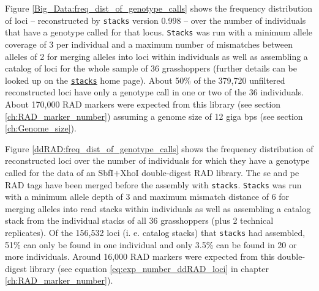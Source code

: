 \documentclass[a4paper,12pt,times,print,index, custombib]{PhDThesisPSnPDF}\usepackage[]{graphicx}\usepackage[]{color}
\begin{document}
Figure \ref{Big_Data:freq_dist_of_genotype_calls} shows the frequency distribution of loci -- reconstructed by \texttt{stacks} version 0.998 -- over the number of individuals that have a genotype called for that locus. \texttt{Stacks} was run with a minimum allele coverage of 3 per individual and a maximum number of mismatches between alleles of 2 for merging alleles into loci within individuals as well as assembling a catalog of loci for the whole sample of 36 grasshoppers (further details can be looked up on the \href{http://creskolab.uoregon.edu/stacks/param_tut.php}{\texttt{stacks}} home page). About 50\% of the 379,720 unfiltered reconstructed loci have only a genotype call in one or two of the 36 individuals. About 170,000 RAD markers were expected from this library (see section \ref{ch:RAD_marker_number}) assuming a genome size of 12 giga \glspl{bp} (see section \ref{ch:Genome_size}).


Figure \ref{ddRAD:freq_dist_of_genotype_calls} shows the frequency distribution of reconstructed loci over the number of individuals for which they have a genotype called for the data of an \gls{SbfI}$+$\gls{XhoI} double-digest RAD library. The \gls{se} and \gls{pe} \glspl{RAD tag} have been merged before the assembly with \texttt{stacks}. \texttt{Stacks} was run with a minimum allele depth of 3 and maximum mismatch distance of 6 for merging alleles into read stacks within individuals as well as assembling a catalog stack from the individual stacks of all 36 grasshoppers (plus 2 technical replicates). Of the 156,532 loci (i. e. catalog stacks) that \texttt{stacks} had assembled, 51\% can only be found in one individual and only 3.5\% can be found in 20 or more individuals. Around 16,000 RAD markers were expected from this double-digest library (see equation \ref{eq:exp_number_ddRAD_loci} in chapter \ref{ch:RAD_marker_number}).

\end{document}
